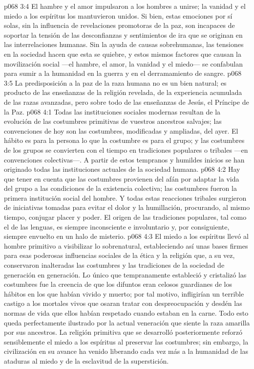\vs p068 3:4 \pc El hambre y el amor impulsaron a los hombres a unirse; la vanidad y el miedo a los espíritus los mantuvieron unidos. Si bien, estas emociones por sí solas, sin la influencia de revelaciones promotoras de la paz, son incapaces de soportar la tensión de las desconfianzas y sentimientos de ira que se originan en las interrelaciones humanas. Sin la ayuda de causas sobrehumanas, las tensiones en la sociedad hacen que esta se quiebre, y estos mismos factores que causan la movilización social ---el hambre, el amor, la vanidad y el miedo--- se confabulan para sumir a la humanidad en la guerra y en el derramamiento de sangre.
\vs p068 3:5 La predisposición a la paz de la raza humana no es un bien natural; es producto de las enseñanzas de la religión revelada, de la experiencia acumulada de las razas avanzadas, pero sobre todo de las enseñanzas de Jesús, el Príncipe de la Paz.
\vs p068 4:1 Todas las instituciones sociales modernas resultan de la evolución de las costumbres primitivas de vuestros ancestros salvajes; las convenciones de hoy son las costumbres, modificadas y ampliadas, del ayer. El hábito es para la persona lo que la costumbre es para el grupo; y las costumbres de los grupos se convierten con el tiempo en tradiciones populares o tribales ---en convenciones colectivas---. A partir de estos tempranos y humildes inicios se han originado todas las instituciones actuales de la sociedad humana.
\vs p068 4:2 Hay que tener en cuenta que las costumbres provienen del afán por adaptar la vida del grupo a las condiciones de la existencia colectiva; las costumbres fueron la primera institución social del hombre. Y todas estas reacciones tribales surgieron de iniciativas tomadas para evitar el dolor y la humillación, procurando, al mismo tiempo, conjugar placer y poder. El origen de las tradiciones populares, tal como el de las lenguas, es siempre inconsciente e involuntario y, por consiguiente, siempre envuelto en un halo de misterio.
\vs p068 4:3 \pc El miedo a los espíritus llevó al hombre primitivo a visibilizar lo sobrenatural, estableciendo así unas bases firmes para esas poderosas influencias sociales de la ética y la religión que, a su vez, conservaron inalteradas las costumbres y las tradiciones de la sociedad de generación en generación. Lo único que tempranamente estableció y cristalizó las costumbres fue la creencia de que los difuntos eran celosos guardianes de los hábitos en los que habían vivido y muerto; por tal motivo, infligirían un terrible castigo a los mortales vivos que osaran tratar con despreocupación y desdén las normas de vida que ellos habían respetado cuando estaban en la carne. Todo esto queda perfectamente ilustrado por la actual veneración que siente la raza amarilla por sus ancestros. La religión primitiva que se desarrolló posteriormente reforzó sensiblemente el miedo a los espíritus al preservar las costumbres; sin embargo, la civilización en su avance ha venido liberando cada vez más a la humanidad de las ataduras al miedo y de la esclavitud de la superstición.
